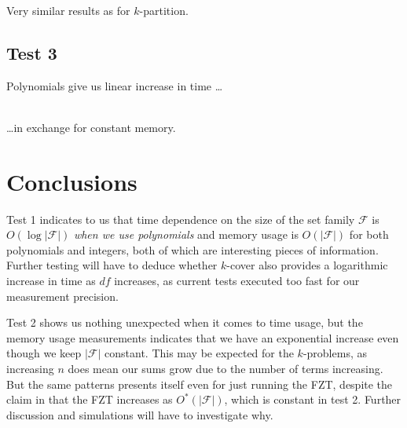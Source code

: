 \documentclass[a4paper, titlepage]{article}
\begin{document}
Very similar results as for $k$-partition.

\subsection*{Test 3}


Polynomials give us linear increase in time \ldots
\\\\

\ldots in exchange for constant memory.

\section{Conclusions}
Test 1 indicates to us that time dependence on the size of the set family $\mathcal{F}$ is $O(\log |\mathcal{F}|)$ \emph{when we use polynomials} and memory usage is $O(|\mathcal{F}|)$ for both polynomials and integers, both of which are interesting pieces of information. Further testing will have to deduce whether $k$-cover also provides a logarithmic increase in time as $df$ increases, as current tests executed too fast for our measurement precision.

Test 2 shows us nothing unexpected when it comes to time usage, but the memory usage measurements indicates that we have an exponential increase even though we keep $|\mathcal{F}|$ constant. This may be expected for the $k$-problems, as increasing $n$ does mean our sums grow due to the number of terms increasing. But the same patterns presents itself even for just running the FZT, despite the claim in \cite{cov_pack} that the FZT increases as $O^*(|\mathcal{F}|)$, which is constant in test 2. Further discussion and simulations will have to investigate why.
\end{document}

